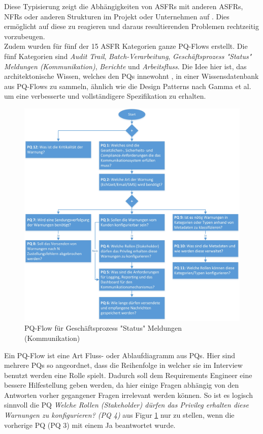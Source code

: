 Diese Typisierung zeigt die Abhängigkeiten von ASFRs mit anderen ASFRs, NFRs oder anderen Strukturen im Projekt oder Unternehmen auf \cite{Ros02}. Dies ermöglicht auf diese zu reagieren und daraus resultierenden Problemen rechtzeitig vorzubeugen. \\

Zudem wurden für fünf der 15 ASFR Kategorien ganze PQ-Flows erstellt. Die fünf Kategorien sind \textit{Audit Trail}, \textit{Batch-Verarbeitung}, \textit{Geschäftsprozess "Status" Meldungen (Kommunikation)}, \textit{Berichte} und \textit{Arbeitsfluss}. Die Idee hier ist, das architektonische Wissen, welches den PQs innewohnt \cite{Ros02}, in einer Wissensdatenbank aus PQ-Flows zu sammeln, ähnlich wie die Design Patterns nach Gamma et al. \cite{Ros03} um eine verbesserte und vollständigere Spezifikation zu erhalten. \\

\begin{figure}[h]
	\centering
	\includegraphics[scale=0.45]{pqflow_communication.jpg} 
	\caption{PQ-Flow für Geschäftsprozess "Status" Meldungen (Kommunikation) \cite{Ros01}}\label{fig_pqflow_communication}
\end{figure}

Ein PQ-Flow ist eine Art Fluss- oder Ablaufdiagramm aus PQs. Hier sind mehrere PQs so angeordnet, dass die Reihenfolge in welcher sie im Interview benutzt werden eine Rolle spielt. Dadurch soll dem Requirements Engineer eine bessere Hilfestellung geben werden, da hier einige Fragen abhängig von den Antworten vorher gegangener Fragen irrelevant werden können. So ist es logisch sinnvoll die PQ \textit{Welche Rollen (Stakeholder) dürfen das Privileg erhalten diese Warnungen zu konfigurieren? (PQ 4)} aus Figur \ref{fig_pqflow_communication} nur zu stellen, wenn die vorherige PQ (PQ 3) mit einem Ja beantwortet wurde. \\

